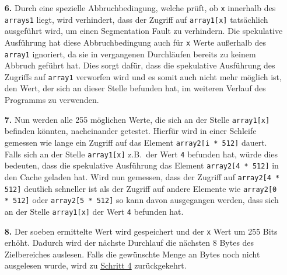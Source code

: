 \begin{itemize}
	\item[\textbf{6.}] Durch eine spezielle Abbruchbedingung, welche prüft, ob \texttt{x} innerhalb des \texttt{arrays1} liegt, wird verhindert, dass der Zugriff auf \texttt{array1[x]} tatsächlich ausgeführt wird, um einen Segmentation Fault zu verhindern.
	      Die spekulative Ausführung hat diese Abbruchbedingung auch für \texttt{x} Werte außerhalb des \texttt{array1} ignoriert, da sie in vergangenen Durchläufen bereits zu keinem Abbruch geführt hat.
	      Dies sorgt dafür, dass die spekulative Ausführung des Zugriffs auf \texttt{array1} verworfen wird und es somit auch nicht mehr möglich ist, den Wert, der sich an dieser Stelle befunden hat, im weiteren Verlauf des Programms zu verwenden.
	\item[\textbf{7.}] Nun werden alle 255 möglichen Werte, die sich an der Stelle \texttt{array1[x]} befinden könnten, nacheinander getestet.
	      Hierfür wird in einer Schleife gemessen wie lange ein Zugriff auf das Element \texttt{array2[i * 512]} dauert.
	      Falls sich an der Stelle \texttt{array1[x]} z.B.~der Wert \texttt{4} befunden hat, würde dies bedeuten, dass die spekulative Ausführung das Element \texttt{array2[4 * 512]} in den Cache geladen hat.
	      Wird nun gemessen, dass der Zugriff auf \texttt{array2[4 * 512]} deutlich schneller ist als der Zugriff auf andere Elemente wie \texttt{array2[0 * 512]} oder \texttt{array2[5 * 512]} so kann davon ausgegangen werden, dass sich an der Stelle \texttt{array1[x]} der Wert \texttt{4} befunden hat.
	\item[\textbf{8.}] Der soeben ermittelte Wert wird gespeichert und der \texttt{x} Wert um 255 Bits erhöht.
	      Dadurch wird der nächste Durchlauf die nächsten 8 Bytes des Zielbereiches auslesen.
	      Falls die gewünschte Menge an Bytes noch nicht ausgelesen wurde, wird zu \hyperref[itm:spectre_step4]{\underline{Schritt 4}} zurückgekehrt.
\end{itemize}

